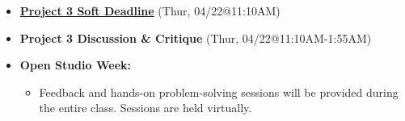\def\dMon{Mon, 04/19}
\def\dTues{Tues, 04/20}
\def\dWed{Wed, 04/21}
\def\dThur{Thur, 04/22}
\def\dFri{Fri, 04/23}
\def\dSat{Sat, 04/24}
\def\dSun{Sun, 04/25}
\placeDate

\begin{itemize}[noitemsep,topsep=0pt,leftmargin=*]
    \item \textcolor{defaultColor}{\ul{\textbf{Project 3 Soft Deadline}} (\dThur @11:10AM)}
    \item \textcolor{defaultColor}{\textbf{Project 3 Discussion \& Critique} (\dThur @11:10AM-1:55AM)}
    \item \textbf{Open Studio Week:}
    \begin{itemize}
        \item Feedback and hands-on problem-solving sessions will be provided during the entire class. Sessions are held virtually. 
    \end{itemize}
\end{itemize}